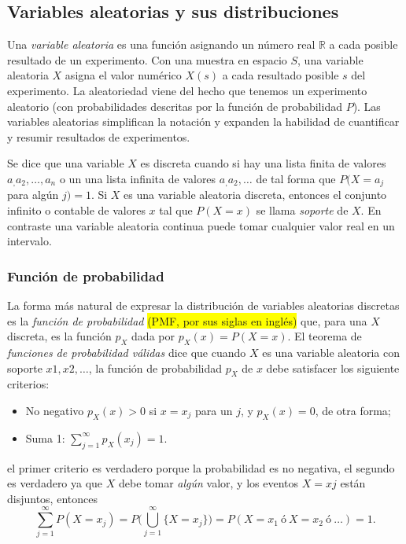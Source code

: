 \documentclass[12pt,letterpaper]{article}
\begin{document}
\subsection {Variables aleatorias y sus distribuciones}
Una \emph{variable aleatoria} es una función asignando un número real $\mathbb{R}$ a cada posible resultado de un experimento. Con una muestra en espacio $S$, una variable aleatoria $X$ asigna el valor numérico $X(s)$ a cada resultado posible $s$ del experimento. La aleatoriedad viene del hecho que tenemos un experimento aleatorio (con probabilidades descritas por la función de probabilidad $P$). Las variables aleatorias simplifican la notación y expanden la habilidad de cuantificar y resumir resultados de experimentos.

Se dice que una variable $X$ es discreta cuando si hay una lista finita de valores $a_,a_2,\ldots,a_n$ o un una lista infinita de valores $a_,a_2,\ldots$ de tal forma que $P(X=a_j$ para algún $j)=1$. Si $X$ es una variable aleatoria discreta, entonces el conjunto infinito o contable de valores $x$ tal que $P(X=x)$ se llama \emph{soporte} de $X$. En contraste una variable aleatoria continua puede tomar cualquier valor real en un intervalo.
\subsubsection {Función de probabilidad}
La forma más natural de expresar la distribución de variables aleatorias discretas es la \emph{función de probabilidad}\cite{blitz19} \colorbox{yellow}{(PMF, por sus siglas en inglés)} que, para una $X$ discreta, es la función $p_X$ dada por $p_X(x)=P(X=x)$. El teorema de \emph{funciones de probabilidad válidas} dice que cuando $X$ es una variable aleatoria con soporte $x1,x2,\ldots$, la función de probabilidad $p_X$ de $x$ debe satisfacer los siguiente criterios:
\begin{itemize}
    \item No negativo $p_X (x) > 0$ si $x=x_j$ para un $j$, y $p_X(x)=0$, de otra forma;
    \item Suma 1: $\sum_{j=1}^{\infty}p_X(x_j)=1$.
\end{itemize}
el primer criterio es verdadero porque la probabilidad es no negativa, el segundo es verdadero ya que $X$ debe tomar \emph{algún} valor, y los eventos ${X=xj}$ están disjuntos, entonces
\begin{equation}
\sum_{j=1}^{\infty}P(X=x_j)=P\bigg(\bigcup_{j=1}^{\infty}\{X=x_j\}\bigg)=P(X=x_1\ \text{ó}\ X=x_2\ \text{ó}\ \ldots)=1.
\end{equation}
\end{document}
